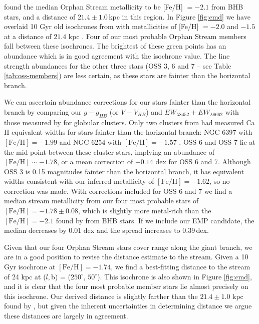 \documentclass{emulateapj}
\begin{document}
\citet{Newberg;et-al_2010} found the median Orphan Stream metallicity to be [Fe/H] $= -2.1$ from BHB stars, and a distance of $21.4 \pm 1.0$\,kpc in this region. In Figure \ref{fig:cmd} we have overlaid 10 Gyr old isochrones from \citet{Girardi;et-al_2008} with metallicities of [Fe/H] $= -2.0$ and $-1.5$ at a distance of $21.4$ kpc \citep{Newberg;et-al_2010}. Four of our most probable Orphan Stream members fall between these isochrones. The brightest of these green points has an abundance which is in good agreement with the isochrone value. The line strength abundances for the other three stars (OSS 3, 6 and 7 \--- see Table \ref{tab:oss-members}) are less certain, as these stars are fainter than the horizontal branch. 

We can ascertain abundance corrections for our stars fainter than the horizontal branch by comparing our $g - g_{HB}$ (or $V-V_{HB}$) and $EW_{\lambda8452} + EW_{\lambda8662}$ with those measured by \citet{Saviane;et-al_2012} for globular clusters. Only two clusters from \citet{Saviane;et-al_2012} had measured Ca \textsc{II} equivalent widths for stars fainter than the horizontal branch: NGC 6397 with $[\mbox{Fe/H}] = -1.99$ and NGC 6254 with $[\mbox{Fe/H}] = -1.57$ \citep[both abundances from][]{Carretta;et-al_2009}. OSS 6 and OSS 7 lie at the mid-point between these cluster stars, implying an abundance of $[\mbox{Fe/H}] \sim -1.78$, or a mean correction of $-0.14$ dex for OSS 6 and 7. Although OSS 3 is 0.15 magnitudes fainter than the horizontal branch, it has equivalent widths consistent with our inferred metallicity of $[\mbox{Fe/H}] = -1.62$, so no correction was made. With corrections included for OSS 6 and 7 we find a median stream metallicity from our four most probable stars of $[\mbox{Fe/H}] = -1.78 \pm 0.08$, which is slightly more metal-rich than the $[\mbox{Fe/H}] =-2.1$ found by \citet{Newberg;et-al_2010} from BHB stars. If we include our EMP candidate, the median decreases by 0.01 dex and the spread increases to 0.39\,dex. 

Given that our four Orphan Stream stars cover range along the giant branch, we are in a good position to revise the distance estimate to the stream. Given a 10 Gyr \citet{Girardi;et-al_2008} isochrone at $[\mbox{Fe/H}] = -1.74$, we find a best-fitting distance to the stream of 24 kpc at ($l, $b) = ($250^\circ$, $50^\circ$). This isochrone is also shown in Figure \ref{fig:cmd}, and it is clear that the four most probable member stars lie almost precisely on this isochrone. Our derived distance is slightly farther than the $21.4 \pm 1.0$ kpc found by \citet{Newberg;et-al_2010}, but given the inherent uncertainties in determining distance we argue these distances are largely in agreement.
\end{document}

